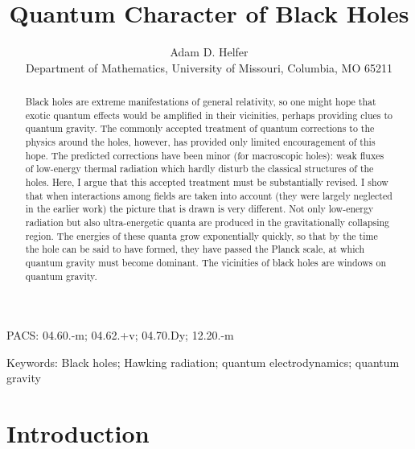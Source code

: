 \documentclass[12pt]{article}
\date{\empty}
\begin{document}
\title{Quantum Character of Black Holes}

\author{Adam D. Helfer\\ %
{\small Department of Mathematics, University of Missouri,
Columbia, MO 65211}}
\maketitle

\begin{abstract}  
Black holes are extreme manifestations of general relativity, so one might hope
that exotic quantum effects would be amplified in their vicinities, perhaps
providing clues to quantum gravity.  The commonly accepted treatment of 
quantum corrections to the physics around the holes, however, has provided only
limited encouragement of this hope. The predicted corrections have been minor
(for macroscopic holes):  weak fluxes of low-energy thermal radiation which
hardly disturb the classical structures of the holes. Here, I argue that this
accepted treatment must be substantially revised.  I show that when
interactions among fields are taken into account (they were 
largely neglected in the
earlier work) the picture that is drawn is very different.  Not only low-energy
radiation but also ultra-energetic quanta are produced in the gravitationally
collapsing region.  The energies of these quanta grow exponentially quickly, so
that by the time the hole can be said to have formed, they have passed the
Planck scale, at which quantum gravity must become dominant.  The vicinities of
black holes are windows on quantum gravity.

\end{abstract}             

\begin{center}
PACS:  04.60.-m; %
04.62.+v; %
04.70.Dy; %
12.20.-m %
\end{center}

\begin{center}
Keywords:  
Black holes; Hawking radiation; quantum electrodynamics;
quantum gravity
\end{center}                                                    



\section{Introduction}
\label{sec:intro}
\end{document}
